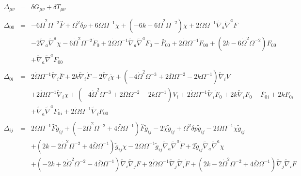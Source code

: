 \documentclass[10pt,letterpaper]{article}
\numberwithin{equation}{section}
\begin{document}
\begin{eqnarray}
\Delta_{\mu\nu}&=&\delta G_{\mu\nu} + \delta T_{\mu\nu}
\\ \nonumber\\
\Delta_{00}&=& -6 \dot{\Omega}^2 \Omega^{-2} \overset{..}{F} + \Omega^2 \delta \rho + 6 \dot{\Omega} \Omega^{-1} \dot{\chi} + (-6 k - 6 \dot{\Omega}^2 \Omega^{-2}) \chi + 2 \dot{\Omega} \Omega^{-1} \tilde{\nabla}_{a}\tilde{\nabla}^{a}\dot{F} \nonumber \\ 
&& - 2 \tilde{\nabla}_{a}\tilde{\nabla}^{a}\chi -6 \dot{\Omega}^2 \Omega^{-2} \dot{F}_{0}{} + 2 \dot{\Omega} \Omega^{-1} \tilde{\nabla}_{a}\tilde{\nabla}^{a}F_{0}{}- \overset{..}{F}_{00}{} + 2 \dot{\Omega} \Omega^{-1} \dot{F}_{00}{} + (2 k - 6 \dot{\Omega}^2 \Omega^{-2}) F_{00}{} \nonumber \\ 
&& + \tilde{\nabla}_{a}\tilde{\nabla}^{a}F_{00}{}
\\  \nonumber\\ 
\Delta_{0i}&=& 2 \dot{\Omega} \Omega^{-1} \tilde{\nabla}_{i}\overset{..}{F} + 2 k \tilde{\nabla}_{i}\dot{F} - 2 \tilde{\nabla}_{i}\dot{\chi} + (-4 \dot{\Omega}^2 \Omega^{-3} + 2 \overset{..}{\Omega} \Omega^{-2} - 2 k \Omega^{-1}) \tilde{\nabla}_{i}V \nonumber \\ 
&& + 2 \dot{\Omega} \Omega^{-1} \tilde{\nabla}_{i}\chi +(-4 \dot{\Omega}^2 \Omega^{-3} + 2 \overset{..}{\Omega} \Omega^{-2} - 2 k \Omega^{-1}) V_{i} + 2 \dot{\Omega} \Omega^{-1} \tilde{\nabla}_{i}\dot{F}_{0}{} + 2 k \tilde{\nabla}_{i}F_{0}{}- \overset{..}{F}_{0}{}_{i} + 2 k F_{0}{}_{i} \nonumber \\ 
&& + \tilde{\nabla}_{a}\tilde{\nabla}^{a}F_{0}{}_{i} + 2 \dot{\Omega} \Omega^{-1} \tilde{\nabla}_{i}F_{00}{}
\\  \nonumber\\ 
\Delta_{ij}&=& 2 \dot{\Omega} \Omega^{-1} \overset{...}{F} \tilde{g}_{ij} + (-2 \dot{\Omega}^2 \Omega^{-2} + 4 \overset{..}{\Omega} \Omega^{-1}) \overset{..}{F} \tilde{g}_{ij} - 2 \overset{..}{\chi} \tilde{g}_{ij} + \Omega^2 \delta p \tilde{g}_{ij} - 2 \dot{\Omega} \Omega^{-1} \dot{\chi} \tilde{g}_{ij} \nonumber \\ 
&& + (2 k - 2 \dot{\Omega}^2 \Omega^{-2} + 4 \overset{..}{\Omega} \Omega^{-1}) \tilde{g}_{ij} \chi - 2 \dot{\Omega} \Omega^{-1} \tilde{g}_{ij} \tilde{\nabla}_{a}\tilde{\nabla}^{a}\dot{F} + 2 \tilde{g}_{ij} \tilde{\nabla}_{a}\tilde{\nabla}^{a}\chi \nonumber \\ 
&& + (-2 k + 2 \dot{\Omega}^2 \Omega^{-2} - 4 \overset{..}{\Omega} \Omega^{-1}) \tilde{\nabla}_{i}\tilde{\nabla}_{j}F + 2 \dot{\Omega} \Omega^{-1} \tilde{\nabla}_{j}\tilde{\nabla}_{i}\dot{F} + (2 k - 2 \dot{\Omega}^2 \Omega^{-2} + 4 \overset{..}{\Omega} \Omega^{-1}) \tilde{\nabla}_{j}\tilde{\nabla}_{i}F \nonumber \\ 

\end{eqnarray}
\end{document}
